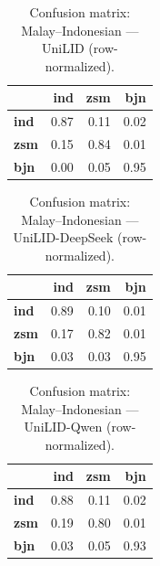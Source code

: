 \begin{table}[htbp]
\centering
\small
\begin{tabular}{lrrr}
\toprule
 & \textbf{ind} & \textbf{zsm} & \textbf{bjn} \\
\midrule
\textbf{ind} & \cellcolor{blue!86}\color{white}0.87 & \cellcolor{blue!11}0.11 & \cellcolor{blue!2}0.02 \\
\textbf{zsm} & \cellcolor{blue!15}0.15 & \cellcolor{blue!83}\color{white}0.84 & \cellcolor{blue!1}0.01 \\
\textbf{bjn} & \cellcolor{blue!0}0.00 & \cellcolor{blue!5}0.05 & \cellcolor{blue!95}\color{white}0.95 \\
\bottomrule
\end{tabular}
\caption{Confusion matrix: Malay--Indonesian — UniLID (row-normalized).}
\label{tab:cm-malay_indonesian-unilid}
\end{table}

\begin{table}[htbp]
\centering
\small
\begin{tabular}{lrrr}
\toprule
 & \textbf{ind} & \textbf{zsm} & \textbf{bjn} \\
\midrule
\textbf{ind} & \cellcolor{blue!88}\color{white}0.89 & \cellcolor{blue!9}0.10 & \cellcolor{blue!1}0.01 \\
\textbf{zsm} & \cellcolor{blue!16}0.17 & \cellcolor{blue!82}\color{white}0.82 & \cellcolor{blue!0}0.01 \\
\textbf{bjn} & \cellcolor{blue!2}0.03 & \cellcolor{blue!2}0.03 & \cellcolor{blue!95}\color{white}0.95 \\
\bottomrule
\end{tabular}
\caption{Confusion matrix: Malay--Indonesian — UniLID-DeepSeek (row-normalized).}
\label{tab:cm-malay_indonesian-unilid-deepseek}
\end{table}

\begin{table}[htbp]
\centering
\small
\begin{tabular}{lrrr}
\toprule
 & \textbf{ind} & \textbf{zsm} & \textbf{bjn} \\
\midrule
\textbf{ind} & \cellcolor{blue!87}\color{white}0.88 & \cellcolor{blue!10}0.11 & \cellcolor{blue!1}0.02 \\
\textbf{zsm} & \cellcolor{blue!18}0.19 & \cellcolor{blue!80}\color{white}0.80 & \cellcolor{blue!1}0.01 \\
\textbf{bjn} & \cellcolor{blue!2}0.03 & \cellcolor{blue!5}0.05 & \cellcolor{blue!92}\color{white}0.93 \\
\bottomrule
\end{tabular}
\caption{Confusion matrix: Malay--Indonesian — UniLID-Qwen (row-normalized).}
\label{tab:cm-malay_indonesian-unilid-qwen}
\end{table}

